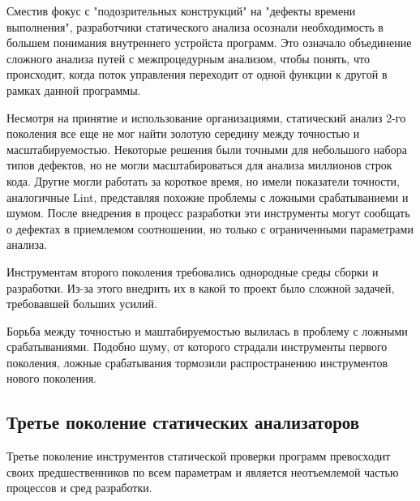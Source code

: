 Сместив фокус с "подозрительных конструкций" на "дефекты времени выполнения", разработчики 
статического анализа осознали необходимость в большем понимания внутреннего 
устройста программ. Это означало объединение сложного анализа путей с межпроцедурным анализом, 
чтобы понять, что происходит, когда поток управления переходит от одной функции к другой в 
рамках данной программы.

Несмотря на принятие и использование организациями, статический анализ 2-го поколения все еще 
не мог найти золотую середину между точностью и масштабируемостью. Некоторые решения были 
точными для небольшого набора типов дефектов, но не могли масштабироваться для анализа 
миллионов строк кода. Другие могли работать за короткое время, но имели показатели точности, 
аналогичные Lint, представляя похожие проблемы с ложными срабатываниеми и шумом. После 
внедрения в процесс разработки эти инструменты могут сообщать о дефектах в приемлемом 
соотношении, но только с ограниченными параметрами анализа. 

Инструментам второго поколения требовались однородные среды сборки и разработки. 
Из-за этого внедрить их в какой то проект было сложной задачей, требовавшей больших усилий.

Борьба между точностью и маштабируемостью вылилась в проблему с ложными срабатываниями. Подобно 
шуму, от которого страдали инструменты первого поколения, ложные срабатывания тормозили 
распространению инструментов нового поколения. 

\subsection{Третье поколение статических анализаторов}
Третье поколение инструментов статической проверки программ превосходит своих предшественников по
всем параметрам и является неотъемлемой частью процессов и сред разработки.  

\subsection{}


\FloatBarrier
